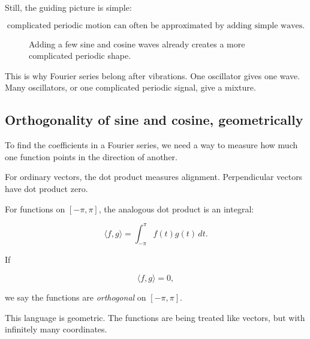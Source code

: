 Still, the guiding picture is simple:

\[
\boxed{
\text{complicated periodic motion can often be approximated by adding simple waves.}
}
\]

\begin{figure}[h]
\centering
{}
\caption{Adding a few sine and cosine waves already creates a more complicated periodic shape.}
\label{fig:fourier-wave-mixture}
\end{figure}

This is why Fourier series belong after vibrations.  One oscillator gives one wave.
Many oscillators, or one complicated periodic signal, give a mixture.

\subsection{Orthogonality of sine and cosine, geometrically}
\label{subsec:orthogonality-sine-cosine-geometrically}

To find the coefficients in a Fourier series, we need a way to measure how much one
function points in the direction of another.

For ordinary vectors, the dot product measures alignment.  Perpendicular vectors have
dot product zero.

For functions on \([-\pi,\pi]\), the analogous dot product is an integral:

\[
\boxed{
\langle f,g\rangle
=
\int_{-\pi}^{\pi} f(t)g(t)\,dt.
}
\]

If

\[
\langle f,g\rangle=0,
\]

we say the functions are \emph{orthogonal} on \([-\pi,\pi]\).

This language is geometric.  The functions are being treated like vectors, but with
infinitely many coordinates.

